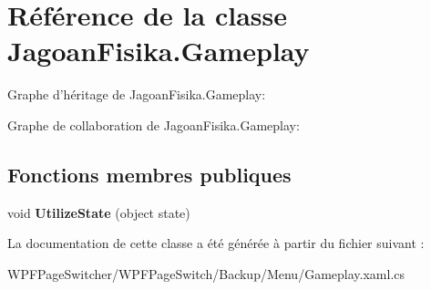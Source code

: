 \hypertarget{class_jagoan_fisika_1_1_gameplay}{\section{Référence de la classe Jagoan\+Fisika.\+Gameplay}
\label{class_jagoan_fisika_1_1_gameplay}
}


Graphe d'héritage de Jagoan\+Fisika.\+Gameplay\+:


Graphe de collaboration de Jagoan\+Fisika.\+Gameplay\+:
\subsection*{Fonctions membres publiques}
\begin{DoxyCompactItemize}
\item 
\hypertarget{class_jagoan_fisika_1_1_gameplay_a9299fc72c4ef6178afabf5606e9aa7bc}{void {\bfseries Utilize\+State} (object state)}\label{class_jagoan_fisika_1_1_gameplay_a9299fc72c4ef6178afabf5606e9aa7bc}

\end{DoxyCompactItemize}


La documentation de cette classe a été générée à partir du fichier suivant \+:\begin{DoxyCompactItemize}
\item 
W\+P\+F\+Page\+Switcher/\+W\+P\+F\+Page\+Switch/\+Backup/\+Menu/Gameplay.\+xaml.\+cs\end{DoxyCompactItemize}
